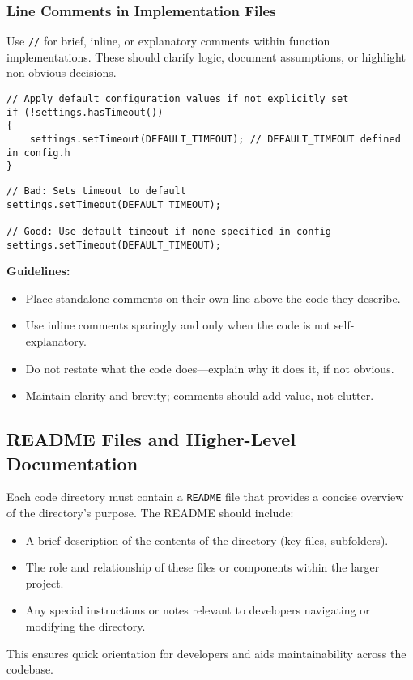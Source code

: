 \subsubsection*{Line Comments in Implementation Files}

Use \texttt{//} for brief, inline, or explanatory comments within function implementations. These should clarify logic, document assumptions, or highlight non-obvious decisions.
\begin{lstlisting}[style=cppstyle]
// Apply default configuration values if not explicitly set
if (!settings.hasTimeout()) 
{
    settings.setTimeout(DEFAULT_TIMEOUT); // DEFAULT_TIMEOUT defined in config.h
}
\end{lstlisting}
\begin{lstlisting}[style=cppstyle]
// Bad: Sets timeout to default
settings.setTimeout(DEFAULT_TIMEOUT);

// Good: Use default timeout if none specified in config
settings.setTimeout(DEFAULT_TIMEOUT);
\end{lstlisting}
\textbf{Guidelines:}
\begin{itemize}\itemsep0em
    \item Place standalone comments on their own line above the code they describe.
    \item Use inline comments sparingly and only when the code is not self-explanatory.
    \item Do not restate what the code does—explain why it does it, if not obvious.
    \item Maintain clarity and brevity; comments should add value, not clutter.
\end{itemize}



\subsection{README Files and Higher-Level Documentation}

Each code directory must contain a \texttt{README} file that provides a concise overview of the directory’s purpose. The README should include:
\begin{itemize}\itemsep0em
    \item A brief description of the contents of the directory (key files, subfolders).
    \item The role and relationship of these files or components within the larger project.
    \item Any special instructions or notes relevant to developers navigating or modifying the directory.
\end{itemize}
This ensures quick orientation for developers and aids maintainability across the codebase.


